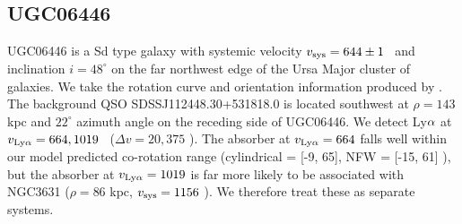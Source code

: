 


\subsection{UGC06446} \label{UGC06446}
UGC06446 is a Sd type galaxy with systemic velocity $v_{\rm sys} = 644 \pm 1$ \kms~and inclination $i = 48^{\circ}$ on the far northwest edge of the Ursa Major cluster of galaxies. We take the rotation curve and orientation information produced by \citep{verheijen2001, swaters2009}. The background QSO SDSSJ112448.30+531818.0 is located southwest at $\rho = 143$ kpc and $22^{\circ}$ azimuth angle on the receding side of UGC06446. We detect Ly$\rm \alpha$ at $v_{\rm Ly\alpha} = 664, 1019$ \kms~($\Delta v = 20, 375$ \kms). The absorber at $v_{\rm Ly\alpha} = 664$ falls well within our model predicted co-rotation range (cylindrical = [-9, 65], NFW = [-15, 61] \kms), but the absorber at $v_{\rm Ly\alpha} = 1019$ is far more likely to be associated with NGC3631 ($\rho = 86$ kpc, $v_{\rm sys} = 1156$ \kms). We therefore treat these as separate systems.






